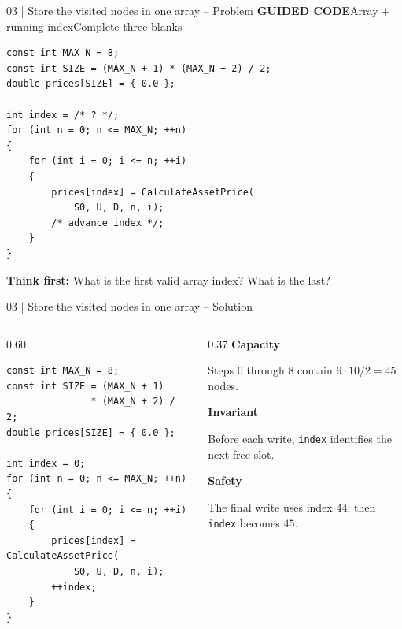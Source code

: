 \documentclass[10pt,aspectratio=169]{beamer}
\newcommand{\problemmeta}[2]{%
 {\color{BootcampBlue}\small\textbf{GUIDED CODE}\quad #1\hfill #2}\par\smallskip\small}
\newcommand{\explain}[2]{%
 {\color{BootcampBlueDark}\textbf{#1}}\par #2\par\medskip}
\begin{document}
\begin{frame}[fragile]{03 | Store the visited nodes in one array -- Problem}
\problemmeta{Array + running index}{Complete three blanks}
\begin{lstlisting}[style=solutioncpp]
const int MAX_N = 8;
const int SIZE = (MAX_N + 1) * (MAX_N + 2) / 2;
double prices[SIZE] = { 0.0 };

int index = /* ? */;
for (int n = 0; n <= MAX_N; ++n)
{
    for (int i = 0; i <= n; ++i)
    {
        prices[index] = CalculateAssetPrice(
            S0, U, D, n, i);
        /* advance index */;
    }
}
\end{lstlisting}
{\small\color{BootcampBlueDark}\textbf{Think first:} What is the first valid array index? What is the last?}
\end{frame}

\begin{frame}[fragile]{03 | Store the visited nodes in one array -- Solution}
\begin{columns}[T,onlytextwidth]
\begin{column}{0.60\textwidth}
\begin{lstlisting}[style=solutioncpp]
const int MAX_N = 8;
const int SIZE = (MAX_N + 1)
               * (MAX_N + 2) / 2;
double prices[SIZE] = { 0.0 };

int index = 0;
for (int n = 0; n <= MAX_N; ++n)
{
    for (int i = 0; i <= n; ++i)
    {
        prices[index] = CalculateAssetPrice(
            S0, U, D, n, i);
        ++index;
    }
}
\end{lstlisting}
\end{column}
\begin{column}{0.37\textwidth}
\small
\explain{Capacity}{Steps $0$ through $8$ contain $9\cdot10/2=45$ nodes.}
\explain{Invariant}{Before each write, \texttt{index} identifies the next free slot.}
\explain{Safety}{The final write uses index $44$; then \texttt{index} becomes $45$.}
\end{column}
\end{columns}
\end{frame}
\end{document}
